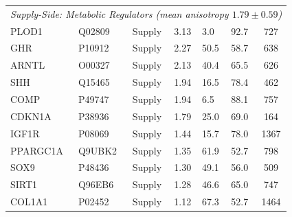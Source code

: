 \begin{table}[h!]
\begin{tabular}{llccllc}
\midrule
\multicolumn{7}{l}{\textit{Supply-Side: Metabolic Regulators (mean anisotropy $1.79 \pm 0.59$)}} \\
PLOD1 & Q02809 & Supply & 3.13 & 3.0 & 92.7 & 727 \\
GHR & P10912 & Supply & 2.27 & 50.5 & 58.7 & 638 \\
ARNTL & O00327 & Supply & 2.13 & 40.4 & 65.5 & 626 \\
SHH & Q15465 & Supply & 1.94 & 16.5 & 78.4 & 462 \\
COMP & P49747 & Supply & 1.94 & 6.5 & 88.1 & 757 \\
CDKN1A & P38936 & Supply & 1.79 & 25.0 & 69.0 & 164 \\
IGF1R & P08069 & Supply & 1.44 & 15.7 & 78.0 & 1367 \\
PPARGC1A & Q9UBK2 & Supply & 1.35 & 61.9 & 52.7 & 798 \\
SOX9 & P48436 & Supply & 1.30 & 49.1 & 56.0 & 509 \\
SIRT1 & Q96EB6 & Supply & 1.28 & 46.6 & 65.0 & 747 \\
COL1A1 & P02452 & Supply & 1.12 & 67.3 & 52.7 & 1464 \\
\bottomrule
\end{tabular}
\end{table}
